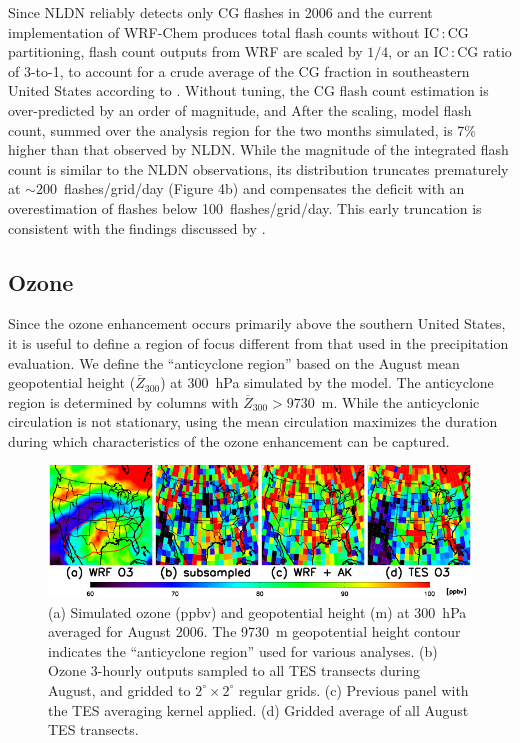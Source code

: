 Since NLDN reliably detects only CG flashes in 2006 and the current implementation of
WRF-Chem produces total flash counts without IC\,:\,CG partitioning, flash count outputs
from WRF are scaled by $1/4$, or an IC\,:\,CG ratio of 3-to-1, to account for a crude average
of the CG fraction in southeastern United States according to \citet{Boccippio:2001ys}.
Without tuning, the CG flash count estimation is over-predicted by an order of magnitude, and
After the scaling, model flash count, summed over the analysis region for the two months simulated,
is 7\% higher than that observed by NLDN.
While the magnitude of the integrated flash count is similar to the NLDN observations,
its distribution truncates prematurely at $\sim200$~flashes/grid/day (Figure 4b) and compensates 
the deficit with an overestimation of flashes below
100~flashes/grid/day. This early truncation is consistent with the findings discussed by
\citet{Wong:2013vn}.

\subsection{Ozone}\label{sect:val/o3}

Since the ozone enhancement occurs primarily above the southern United States, it is
useful to define a region of focus different from that used in the precipitation evaluation.
We define the ``anticyclone region'' based on the August mean geopotential height
($\overline Z_{300}$) at 300~hPa simulated by the model. The anticyclone region is determined
by columns with $\overline Z_{300}>9730$~m. While the anticyclonic circulation is not stationary, using
the mean circulation maximizes the duration during which characteristics of the ozone
enhancement can be captured.

 \begin{figure}
 \noindent\includegraphics[width=40pc]{figures/o3/tes08_o3.png}
 \caption{(a) Simulated ozone (ppbv) and geopotential height (m) at 300~hPa averaged for August
2006. The 9730~m geopotential height contour indicates the ``anticyclone region'' used for
various analyses. (b) Ozone 3-hourly outputs sampled to all TES transects during August, and gridded
to $2^\circ\times2^\circ$ regular grids. (c) Previous panel with the TES averaging kernel applied.
(d) Gridded average of all August TES transects.}
 \label{fig:o3_map}
 \end{figure}


